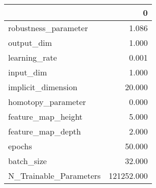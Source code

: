 \begin{tabular}{lr}
\toprule
{} &           0 \\
\midrule
robustness\_parameter   &       1.086 \\
output\_dim             &       1.000 \\
learning\_rate          &       0.001 \\
input\_dim              &       1.000 \\
implicit\_dimension     &      20.000 \\
homotopy\_parameter     &       0.000 \\
feature\_map\_height     &       5.000 \\
feature\_map\_depth      &       2.000 \\
epochs                 &      50.000 \\
batch\_size             &      32.000 \\
N\_Trainable\_Parameters &  121252.000 \\
\bottomrule
\end{tabular}
